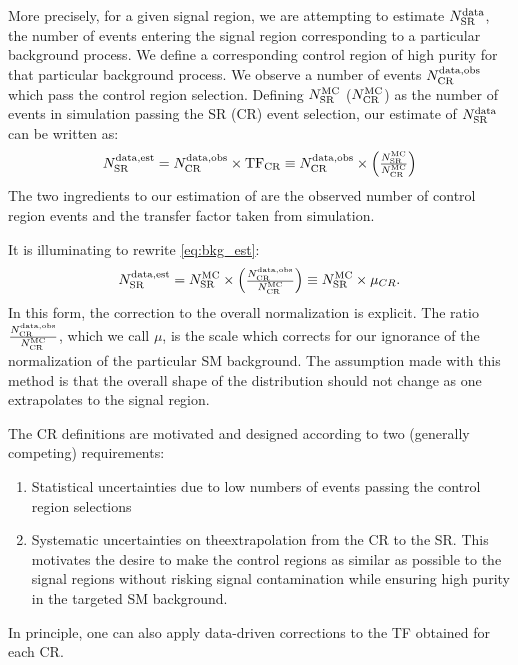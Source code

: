 More precisely, for a given signal region, we are attempting to estimate $\ntext{SR}{data}$, the number of events entering the signal region corresponding to a particular background process.
We define a corresponding control region of high purity for that particular background process.
We observe a number of events $\ntext{CR}{data,obs}$ which pass the control region selection.
Defining $\ntext{SR}{MC}$ ($\ntext{CR}{MC}$) as the number of events in simulation passing the SR (CR) event selection, our estimate of $\ntext{SR}{data}$ can be written as:
\begin{align}\label{eq:bkg_est}
\ntext{SR}{data,est} = \ntext{CR}{data,obs} \times \text{TF}_{\text{CR}} \equiv \ntext{CR}{data,obs} \times  \begin{pmatrix} \frac{ \ntext{SR}{MC} }{ \ntext{CR}{MC} } \end{pmatrix}
\end{align}
The two ingredients to our estimation of  are the observed number of control region events  and the transfer factor taken from simulation.

It is illuminating to rewrite \cref{eq:bkg_est}:
\begin{align}\label{eq:bkg_est_simple}
\ntext{SR}{data,est} = \ntext{SR}{MC} \times  \begin{pmatrix} \frac{\ntext{CR}{data,obs}  }{ \ntext{CR}{MC} } \end{pmatrix} \equiv \ntext{SR}{MC} \times \mu_{CR}.
\end{align}
In this form, the correction to the overall normalization is explicit.
The ratio $\frac{\ntext{CR}{data,obs}}{ \ntext{CR}{MC} }$, which we call $\mu$, is the scale which corrects for our ignorance of the normalization of the particular SM background.
The assumption made with this method is that the overall shape of the distribution should not change as one extrapolates to the signal region.

The CR definitions are motivated and designed according to two (generally competing) requirements:
\begin{enumerate}
\item Statistical uncertainties due to low numbers of events passing the control region selections
\item Systematic uncertainties on theextrapolation from the CR to the SR.  This motivates the desire to make the control regions as similar as possible to the signal regions without risking signal contamination while ensuring high purity in the targeted SM background.
\end{enumerate}
In principle, one can also apply data-driven corrections to the TF obtained for each CR.

